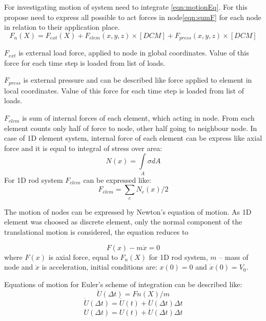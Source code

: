 \documentclass[12pt]{report}
\begin{document}
For investigating motion of system need to integrate \eqref{eqn:motionEq}. For this propose need to express all possible 
to act forces in node\eqref{eqn:sumF} for each node in relation to their application place. 
\begin{equation}\label{eqn:sumF}
   F_n(X)=
   F_{ext}(X)+
   F_{elem}(x, y, z)\times[DCM]+
   F_{press}(x, y, z)\times[DCM]
\end{equation}\par
$F_{ext}$ is external load force, applied to node in global coordinates. Value of this force for each time step is loaded
from list of loads.\par
$F_{press}$ is external pressure and can be described like force applied to element in local coordinates. Value of this force
for each time step is loaded from list of loads.\par
$F_{elem}$ is sum of internal forces of each element, which acting in node. From each element counts only half of force to 
node, other half going to neighbour node. In case of 1D element system, internal force of each element can be express like
axial force and it is equal to integral of stress over area:
\begin{equation}\label{eqn:Nx}
  N(x)= \int\limits_A \sigma dA
\end{equation}
For 1D rod system $F_{elem}$ can be expressed like:
\begin{equation}\label{eqn:Felem}
  F_{elem}= \sum_{e}N_e(x)/2
\end{equation}\par
The motion of nodes can be expressed by Newton's equation of motion. As 1D element was choosed as discrete element, 
only the normal component of the translational motion is considered, the equation reduces to\par
\begin{equation}\label{eqn:motionEq}
   F(x)-m\ddot{x}=0
\end{equation}
where $F(x)$ is axial force, equal to $F_n(X)$ for 1D rod system, $m$ – mass of node and $\ddot{x}$ is acceleration, initial conditions are: $x(0)=0$ and
$\dot{x}(0)=V_0$.\par
Equations of motion for Euler's scheme of integration can be described like:
\begin{equation}\label{eqn:Accel}
  \ddot{U}(\Delta t)=Fn(X)/m
\end{equation}
\begin{equation}\label{eqn:Velos}
  \dot{U}(\Delta t)=\dot{U}(t)+\ddot{U}(\Delta t)\Delta t
\end{equation}
\begin{equation}\label{eqn:Displ}
  U(\Delta t)=U(t)+\dot{U}(\Delta t)\Delta t
\end{equation}
\end{document}
